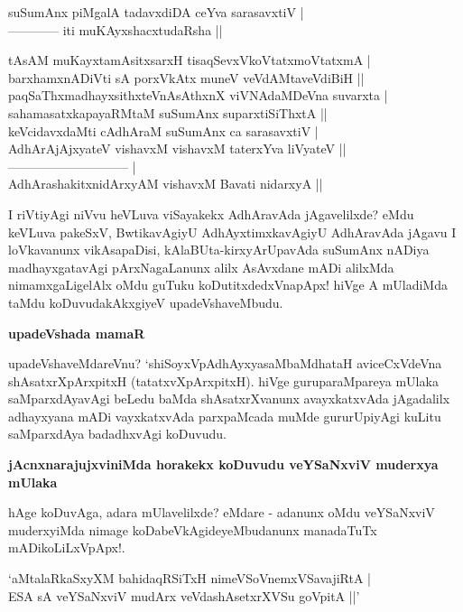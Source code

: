 \begin{shloka}
suSumAnx piMgalA tadavxdiDA ceYva sarasavxtiV |\\\label{82}
------------ iti muKAyxshacxtudaRsha ||
\end{shloka}

\begin{shloka}
tAsAM muKayxtamAsitxsarxH tisaqSevxVkoVtatxmoVtatxmA |\\
barxhamxnADiVti sA porxVkAtx muneV veVdAMtaveVdiBiH ||\\
paqSaThxmadhayxsithxteVnAsAthxnX viVNAdaMDeVna suvarxta |\\
sahamasatxkapayaRMtaM suSumAnx suparxtiSiThxtA ||\\

keVcidavxdaMti cAdhAraM suSumAnx ca sarasavxtiV |\\\label{82}
AdhArAjAjxyateV vishavxM vishavxM taterxYva liVyateV ||\\
----------------------------- |\\
AdhArashakitxnidArxyAM vishavxM Bavati nidarxyA ||
\end{shloka}

I riVtiyAgi niVvu heVLuva viSayakekx AdhAravAda jAgavelilxde? eMdu keVLuva pakeSxV, Bwtika\-vAgiyU AdhAyxtimxkavAgiyU AdhAravAda jAgavu I loVkavanunx vikAsapaDisi, kAlaBUta-kirxyArUpavAda suSumAnx nADiya madhayxgatavAgi pArxNagaLanunx alilx AsAvxdane mADi alilxMda nimamxgaLi\-gelAlx oMdu guTuku koDutitxdedxVnapApx! hiVge A mUladiMda taMdu koDuvudakAkxgiyeV upadeVsha\-veMbudu.

{\bigskip
\noindent
{\large\bf upadeVshada mamaR}}\label{page83}
\medskip

\noindent
upadeVshaveMdareVnu? `shiSoyxVpAdhAyxyasaMbaMdhataH\label{83} aviceCxVdeVna shAsatxrXpArxpitxH (tatatxvXpArxpitxH). hiVge gu\-ru\-paraMpareya mUlaka saMparxdAyavAgi beLedu baMda shAsatxrXvanunx avayxkatxvAda jAgadalilx adhayxyana mADi vayxkatxvAda parxpaMcada muMde gururUpiyAgi kuLitu saMparxdAya badadhxvAgi koDuvudu.

{\bigskip
\noindent
{\large\bf jAcnxnarajujxviniMda horakekx koDuvudu veYSaNxviV muderxya mUlaka}}\label{page83}
\medskip

\noindent
hAge koDuvAga, adara mUlavelilxde? eMdare - adanunx oMdu veYSaNxviV muderxyiMda nimage koDa\-beVkAgideyeMbudanunx manadaTuTx mADikoLiLxVpApx!.

\begin{shloka}
`aMtalaRkaSxyXM bahidaqRSiTxH nimeVSoVnemxVSavajiRtA |\\\label{83}
ESA sA veYSaNxviV mudArx veVdashAsetxrXVSu goVpitA ||'
\end{shloka}

